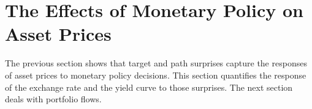{%

}{}	%


\section{The Effects of Monetary Policy on Asset Prices} \label{sec:assets}
\iftoggle{toclinks}{\gototoc}{} %
The previous section shows that target and path surprises capture the responses of asset prices to monetary policy decisions.
This section quantifies the response of the exchange rate and the yield curve to those surprises. 
The next section deals with portfolio flows.

